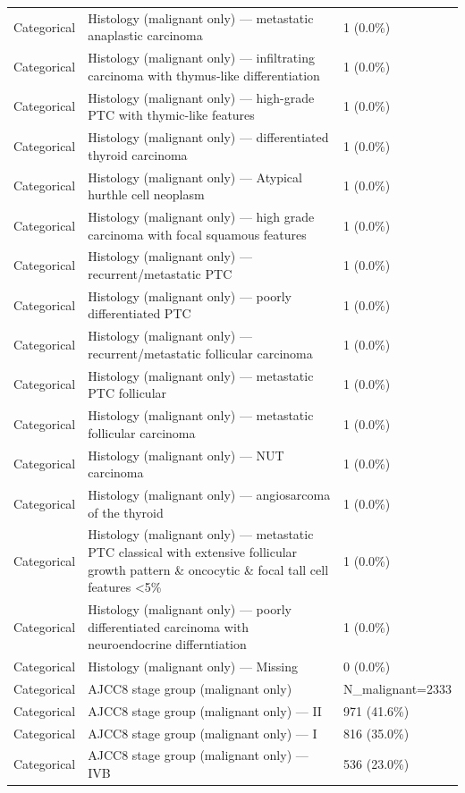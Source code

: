 \begin{table}[htbp]
\begin{tabular}{lll}
Categorical & Histology (malignant only) — metastatic anaplastic carcinoma & 1 (0.0\%) \\
Categorical & Histology (malignant only) — infiltrating carcinoma with thymus-like differentiation & 1 (0.0\%) \\
Categorical & Histology (malignant only) — high-grade PTC with thymic-like features & 1 (0.0\%) \\
Categorical & Histology (malignant only) — differentiated thyroid carcinoma & 1 (0.0\%) \\
Categorical & Histology (malignant only) — Atypical hurthle cell neoplasm & 1 (0.0\%) \\
Categorical & Histology (malignant only) — high grade carcinoma with focal squamous features & 1 (0.0\%) \\
Categorical & Histology (malignant only) — recurrent/metastatic PTC & 1 (0.0\%) \\
Categorical & Histology (malignant only) — poorly differentiated PTC & 1 (0.0\%) \\
Categorical & Histology (malignant only) — recurrent/metastatic follicular carcinoma & 1 (0.0\%) \\
Categorical & Histology (malignant only) — metastatic PTC follicular & 1 (0.0\%) \\
Categorical & Histology (malignant only) — metastatic follicular carcinoma & 1 (0.0\%) \\
Categorical & Histology (malignant only) — NUT carcinoma & 1 (0.0\%) \\
Categorical & Histology (malignant only) — angiosarcoma of the thyroid & 1 (0.0\%) \\
Categorical & Histology (malignant only) — metastatic PTC classical with extensive follicular growth pattern \& oncocytic \& focal tall cell features <5\% & 1 (0.0\%) \\
Categorical & Histology (malignant only) — poorly differentiated carcinoma with neuroendocrine differntiation & 1 (0.0\%) \\
Categorical & Histology (malignant only) — Missing & 0 (0.0\%) \\
Categorical & AJCC8 stage group (malignant only) & N\_malignant=2333 \\
Categorical & AJCC8 stage group (malignant only) — II & 971 (41.6\%) \\
Categorical & AJCC8 stage group (malignant only) — I & 816 (35.0\%) \\
Categorical & AJCC8 stage group (malignant only) — IVB & 536 (23.0\%) \\

\end{tabular}
\end{table}
